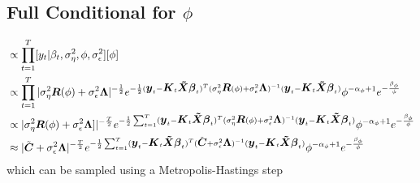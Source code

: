 \documentclass[fleqn]{article}
\def\bm#1{\mbox{\boldmath $#1$}}
\begin{document}
\subsection{Full Conditional for $\phi$}
%
\begin{align*}
  [\phi | \cdot] & \propto \prod_{t = 1}^T [y_t | \beta_t, \sigma^2_\eta, \phi, \sigma^2_\epsilon] [\phi]\\
%
& \propto \prod_{t = 1}^T | \sigma^2_\eta \bm{R}(\phi) + \sigma^2_\epsilon \bm{\Lambda} |^{ - \frac{1} {2}} e^{ - \frac{1} {2} (\bm{y}_t - \bm{K}_t \bm{\tilde{X}} \bm{\beta}_t)^T (\sigma^2_\eta \bm{R}(\phi) + \sigma^2_\epsilon \bm{\Lambda})^{ - 1} (\bm{y}_t - \bm{K}_t \bm{\tilde{X}} \bm{\beta}_t)} \phi^{ - \alpha_\phi + 1} e^{ - \frac{\beta_\phi} {\phi}}\\
%
& \propto | \sigma^2_\eta \bm{R}(\phi) + \sigma^2_\epsilon \bm{\Lambda}  ]|^{ - \frac{T} {2}} e^{ - \frac{1} {2} \sum_{t = 1}^T (\bm{y}_t - \bm{K}_t \bm{\tilde{X}} \bm{\beta}_t)^T (\sigma^2_\eta \bm{R}(\phi) + \sigma^2_\epsilon \bm{\Lambda})^{ - 1} (\bm{y}_t - \bm{K}_t \bm{\tilde{X}} \bm{\beta}_t)} \phi^{ - \alpha_\phi + 1} e^{ - \frac{\beta_\phi} {\phi}}\\
%
& \approx | \tilde{\bm{C}} + \sigma^2_\epsilon \bm{\Lambda} |^{ - \frac{T} {2}} e^{ - \frac{1} {2} \sum_{t = 1}^T (\bm{y}_t - \bm{K}_t \bm{\tilde{X}} \bm{\beta}_t)^T (\tilde{\bm{C}} + \sigma^2_\epsilon \bm{\Lambda})^{ - 1} (\bm{y}_t - \bm{K}_t \bm{\tilde{X}} \bm{\beta}_t)} \phi^{ - \alpha_\phi + 1} e^{ - \frac{\beta_\phi} {\phi}}
\end{align*}
% 
which can be sampled using a Metropolis-Hastings step
%
\end{document}
